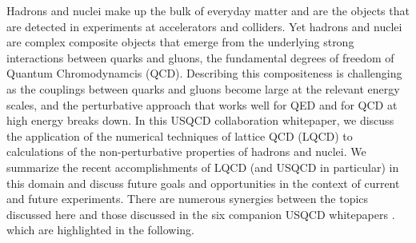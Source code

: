 Hadrons and nuclei make up the bulk of everyday matter and are the objects that are detected in experiments at accelerators and colliders. Yet hadrons and nuclei are complex composite objects that emerge from the underlying strong interactions between quarks and gluons, the fundamental degrees of freedom of Quantum Chromodynamcis (QCD). Describing this compositeness is challenging as the couplings between quarks and gluons become large at the relevant energy scales, and the perturbative approach that works well for QED and for QCD at high energy breaks down.
%
In this USQCD collaboration whitepaper, we discuss the application of the numerical techniques of lattice QCD (LQCD) to calculations of the non-perturbative properties of hadrons and nuclei. We summarize the  recent accomplishments of LQCD (and USQCD in particular) in this domain and discuss future goals and opportunities in the context of current and future experiments. There  are numerous synergies between the topics discussed here and those discussed in the six companion USQCD whitepapers
\cite{Bazavov:2018qcd,Brower:2018qcd,Davoudi:2018qcd,Joo:2018qcd,Kronfeld:2018qcd,Lehner:2018qcd}.
which are highlighted in the following.

